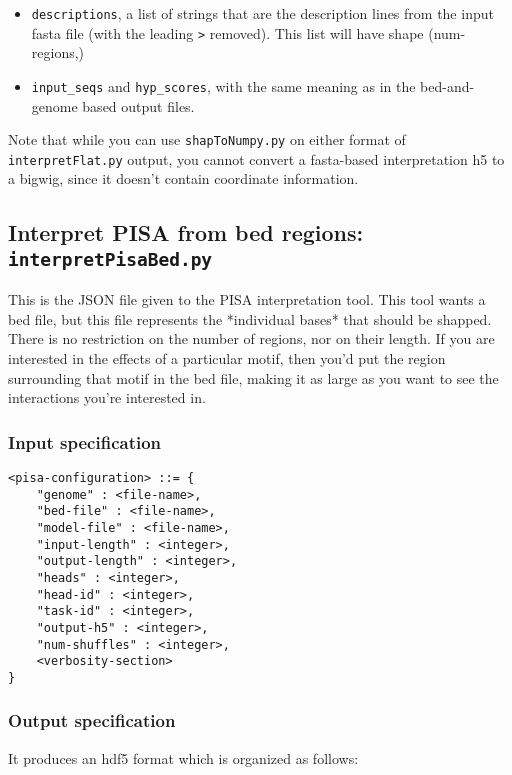 \documentclass{article}
\begin{document}
\begin{itemize}
    \item \texttt{descriptions}, a list of strings that are the description lines from
        the input fasta file (with the leading \texttt{>} removed). This list will have shape
        (num-regions,)
    \item \texttt{input\_seqs} and \texttt{hyp\_scores}, with the same meaning
        as in the bed-and-genome based output files.
\end{itemize}

Note that while you can use \texttt{shapToNumpy.py} on either format of \texttt{interpretFlat.py} output,
you cannot convert a fasta-based interpretation h5 to a bigwig, since it doesn't contain
coordinate information.


\newpage
\subsection{Interpret PISA from bed regions: \texttt{interpretPisaBed.py}}

This is the JSON file given to the PISA interpretation tool.
This tool wants a bed file, but this file represents the *individual bases* that should be shapped.
There is no restriction on the number of regions, nor on their length. If you are interested in
the effects of a particular motif,
then you'd put the region surrounding that motif in the bed file, making it as large as you want
to see the interactions you're interested in.

\subsubsection{Input specification}

\begin{lstlisting}
<pisa-configuration> ::= {
    "genome" : <file-name>,
    "bed-file" : <file-name>,
    "model-file" : <file-name>,
    "input-length" : <integer>,
    "output-length" : <integer>,
    "heads" : <integer>,
    "head-id" : <integer>,
    "task-id" : <integer>,
    "output-h5" : <integer>,
    "num-shuffles" : <integer>,
    <verbosity-section>
}
\end{lstlisting}

\subsubsection{Output specification}

It produces an hdf5 format which is organized as follows:
\end{document}
